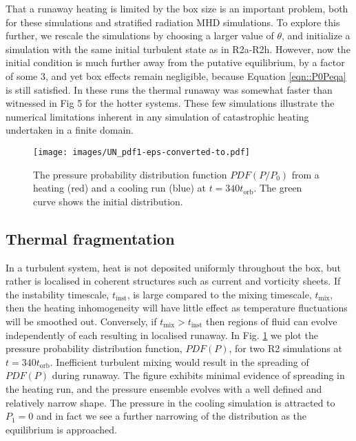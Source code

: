 \documentclass[useAMS]{mn2e}
\begin{document}
That a runaway heating is limited by
the box size is an important problem, both for these simulations and
stratified radiation MHD simulations. To explore this further, we
rescale the simulations by choosing a larger value of $\theta$, and initialize a
simulation with the same initial turbulent state as in
R2a-R2h. However, now the initial condition is much further away from
the putative equilibrium, by a factor of some 3, and yet box effects
remain negligible, because 
Equation \eqref{eqn::P0Peqa} is still satisfied. In these runs
the thermal runaway was somewhat faster than witnessed in Fig 5 for
the hotter systems. These few simulations illustrate the numerical 
limitations inherent in any simulation of catastrophic heating
undertaken in a finite domain.



\begin{figure}
\texttt{[image: images/UN\_pdf1-eps-converted-to.pdf]}
\caption{The pressure probability distribution function $PDF(P/P_{0})$ from a heating (red) and a cooling run (blue) at $t=340t_{\text{orb}}$. The green curve shows the initial distribution.}
\label{fig::UN_pdf_P}
\end{figure}


\subsection{Thermal fragmentation}


In a turbulent system, heat is not deposited uniformly throughout the
box, but
rather is localised in coherent structures such as current and
vorticity sheets. If the instability timescale, $t_{\text{inst}}$, is large
compared to the mixing timescale, $t_{\text{mix}}$, then the
heating inhomogeneity will have little effect as temperature
fluctuations will be smoothed out. Conversely, if $t_{\text{mix}}>t_{\text{inst}}$
then regions of fluid can evolve independently of each resulting
in localised runaway. In Fig. \ref{fig::UN_pdf_P} we plot the
pressure probability distribution function, $PDF(P)$, for two R2
simulations at $t=340t_{\text{orb}}$. Inefficient turbulent mixing would
result in the spreading of $PDF(P)$ during runaway. The figure exhibits
minimal evidence of spreading in the heating run, and the pressure ensemble
evolves with a well defined and relatively narrow shape. The pressure in the  
cooling simulation is attracted to $P_{1}=0$ and in fact
 we see a further 
narrowing of the distribution as the equilibrium is approached.  
\end{document}
